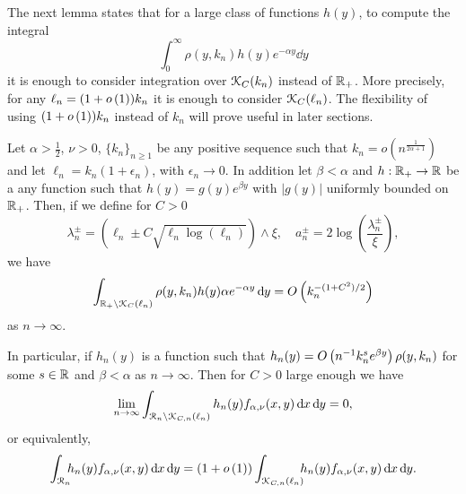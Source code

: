 The next lemma states that for a large class of functions $h(y)$, to compute the integral 
\[
	\int_{0}^\infty \rho(y,k_n) h(y) e^{-\alpha y} \dd y
\]
it is enough to consider integration over ${\mathcal K}_C(k_n)$ instead of ${\mathbb R}_+$. More precisely, for any $\ell_n = (1 + o\left(1\right))k_n$ it is enough to consider ${\mathcal K}_C(\ell_n)$. The flexibility of using $(1+o\left(1\right))k_n$ instead of $k_n$ will prove useful in later sections.

\begin{lemma}\label{lem:concentration_argument}
Let $\alpha > \frac{1}{2}$, $\nu > 0$, $\{k_n\}_{n \ge 1}$ be any positive sequence such that $k_n = o(n^{\frac{1}{2\alpha + 1}})$ and let $\ell_n = k_n(1 + \epsilon_n)$, with $\epsilon_n \to 0$. In addition let $\beta < \alpha$ and $h : {\mathbb R}_+ \rightarrow  {\ensuremath{\mathbb R}}$ be a any function such that $h(y) = g(y)e^{\beta y}$ with $|g(y)|$ uniformly bounded on ${\mathbb R}_+$. Then, if we define for $C > 0$
\[
	\lambda_n^\pm = (\ell_n \pm C \sqrt{\ell_n \log(\ell_n)}) \wedge \xi, 
	\quad a_n^\pm = 2 \log\left(\frac{\lambda_n^\pm}{\xi}\right),
\] 
we have
\begin{equation}\label{eq:error_bound_int_rho_not_K}
	\int_{{\mathbb R}_+ \setminus {\mathcal K}_{C}(\ell_n)} \rho(y,k_n) h(y) \alpha e^{-\alpha y} \operatorname{\mathrm{d}\hspace{-2pt}} y
	= O\left(k_n^{-(1+C^2)/2}\right)
\end{equation}
as $n \to \infty$. 

In particular, if $h_n(y)$ is a function such that $h_n(y) = O\left(n^{-1} k_n^{s} e^{\beta y}\right)\rho(y,k_n)$ for some $s \in {\ensuremath{\mathbb R}}$ and $\beta < \alpha$ as $n \to \infty$. Then for $C > 0$ large enough we have
\[
	\lim_{n \to \infty} \int_{{\mathcal R}_n \setminus {\mathcal K}_{C,n}(\ell_n)} h_n(y) 
	f_{\alpha, \nu}(x,y) \operatorname{\mathrm{d}\hspace{-2pt}} x \operatorname{\mathrm{d}\hspace{-2pt}} y = 0,
\]
or equivalently,
\[
	\int_{{\mathcal R}_n} \hspace{-5pt} h_n(y) f_{\alpha, \nu}(x,y) \operatorname{\mathrm{d}\hspace{-2pt}} x \operatorname{\mathrm{d}\hspace{-2pt}} y
	= (1+o\left(1\right)) \int_{{\mathcal K}_{C,n}(\ell_n)} \hspace{-5pt} h_n(y) f_{\alpha, \nu}(x,y) \operatorname{\mathrm{d}\hspace{-2pt}} x \operatorname{\mathrm{d}\hspace{-2pt}} y.
\]
\end{lemma}

